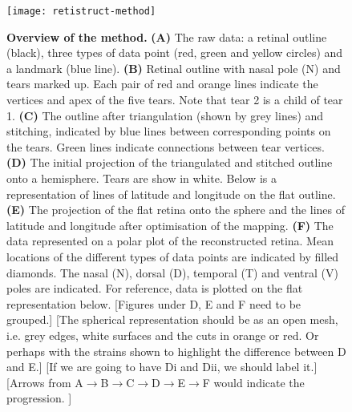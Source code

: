 \documentclass[10pt]{article}
\newcommand{\todo}[1]{{\color{red}[#1]}}
\begin{document}
\begin{figure}[!ht]
  \texttt{[image: retistruct-method]}
  
  \vspace*{-4.54in}

  \mbox{}

  \vspace*{2.27in}

  \caption{\textbf{Overview of the method.} \textbf{(A)} The raw data:
    a retinal outline (black), three types of data point (red, green
    and yellow circles) and a landmark (blue line). \textbf{(B)}
    Retinal outline with nasal pole (N) and tears marked up. Each pair
    of red and orange lines indicate the vertices and apex of the five
    tears. Note that tear 2 is a child of tear 1. \textbf{(C)} The
    outline after triangulation (shown by grey lines) and stitching,
    indicated by blue lines between corresponding points on the
    tears. Green lines indicate connections between tear vertices.
    \textbf{(D)} The initial projection of the triangulated and
    stitched outline onto a hemisphere. Tears are show in white. Below
    is a representation of lines of latitude and longitude on the flat
    outline. \textbf{(E)} The projection of the flat retina onto the
    sphere and the lines of latitude and longitude after optimisation
    of the mapping. \textbf{(F)} The data represented on a polar plot
    of the reconstructed retina. Mean locations of the different types
    of data points are indicated by filled diamonds. The nasal (N),
    dorsal (D), temporal (T) and ventral (V) poles are indicated. For
    reference, data is plotted on the flat representation below.
    \todo{Figures under D, E and F need to be grouped.}
    \todo{The spherical representation should be as an open mesh,
      i.e. grey edges, white surfaces and the cuts in orange or
      red. Or perhaps with the strains shown to highlight the
      difference between D and E.}
    \todo{If we are going to have Di and Dii, we should label it.}
    \todo{Arrows from
      A$\rightarrow$B$\rightarrow$C$\rightarrow$D$\rightarrow$E$\rightarrow$F
      would indicate the progression. }}
  \label{fold-sphere:fig:method}
\end{figure}
\end{document}
